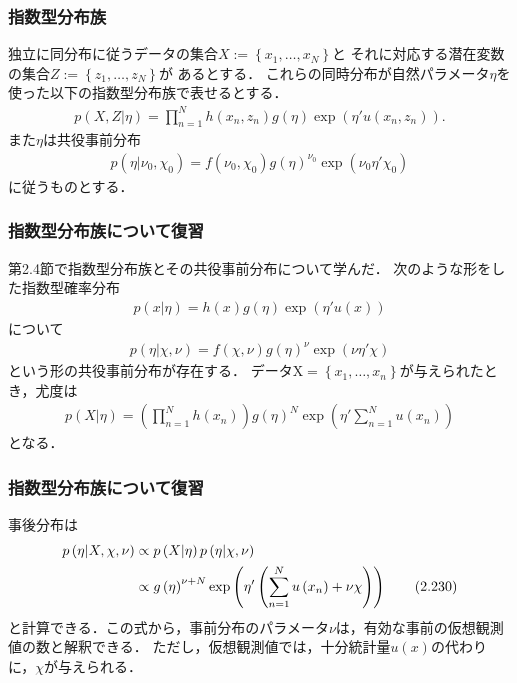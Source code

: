 \documentclass[10pt,hyperref={unicode}]{beamer}
\newcommand{\parentheses}[1]{\left(#1\right)}
\newcommand{\braces}[1]{\left\{#1\right\}}
\begin{document}
\begin{frame}
\frametitle{指数型分布族}
独立に同分布に従うデータの集合$X := \braces{x_1,\ldots,x_N}$と
それに対応する潜在変数の集合$Z := \braces{z_1,\ldots,z_N}$が
あるとする．
これらの同時分布が自然パラメータ$\eta$を
使った以下の指数型分布族で表せるとする．
\begin{align*}
    p\parentheses{X,Z|\eta} = \prod_{n = 1}^N h\parentheses{x_n,z_n}g\parentheses{\eta}\exp\parentheses{\eta'u\parentheses{x_n,z_n}}. \tag{10.113}
\end{align*}
また$\eta$は共役事前分布
\begin{align*}
    p\parentheses{\eta|\nu_0,\chi_0} = f\parentheses{\nu_0,\chi_0}g\parentheses{\eta}^{\nu_0}\exp\parentheses{\nu_0\eta'\chi_0}
\end{align*}
に従うものとする．
\end{frame}

\begin{frame}
\frametitle{指数型分布族について復習}
第2.4節で指数型分布族とその共役事前分布について学んだ．
次のような形をした指数型確率分布
\begin{align}
    p\parentheses{x|\eta}
    = h\parentheses{x}g\parentheses{\eta}\exp\parentheses{\eta'u\parentheses{x}} \tag{2.194}
\end{align}
について
\begin{align}
    p\parentheses{\eta | \chi, \nu}
    = f\parentheses{\chi, \nu} g\parentheses{\eta}^\nu \exp \parentheses{\nu \eta' \chi} \tag{2.229}
\end{align}
という形の共役事前分布が存在する．
データ$\mathrm{X} = \braces{x_1,\ldots,x_n}$が与えられたとき，尤度は
\begin{align}
    p\parentheses{X|\eta}
    = \parentheses{\prod_{n = 1}^N h\parentheses{x_n}} g\parentheses{\eta}^N \exp\parentheses{\eta'\sum_{n = 1}^N u\parentheses{x_n}} \tag{2.227}
\end{align}
となる．
\end{frame}

\begin{frame}
\frametitle{指数型分布族について復習}
事後分布は
\begin{align}
    p\parentheses{\eta | X,\chi,\nu}
    & \propto p\parentheses{X | \eta} p\parentheses{\eta| \chi, \nu} \notag \\
    & \propto g\parentheses{\eta}^{\nu + N} \exp \parentheses{\eta' \parentheses{\sum_{n =1}^N u\parentheses{x_n} + \nu \chi}} \tag{2.230}
\end{align}
と計算できる．この式から，事前分布のパラメータ$\nu$は，有効な事前の仮想観測値の数と解釈できる．
ただし，仮想観測値では，十分統計量$u\parentheses{x}$の代わりに，$\chi$が与えられる．
\end{frame}
\end{document}
